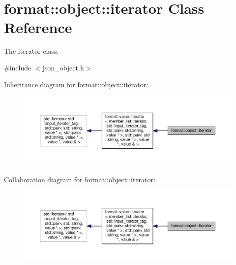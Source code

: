 \hypertarget{classformat_1_1object_1_1iterator}{}\section{format\+:\+:object\+:\+:iterator Class Reference}
\label{classformat_1_1object_1_1iterator}


The iterator class.  




{\ttfamily \#include $<$json\+\_\+object.\+h$>$}



Inheritance diagram for format\+:\+:object\+:\+:iterator\+:
\nopagebreak
\begin{figure}[H]
\begin{center}
\leavevmode
\includegraphics[width=350pt]{classformat_1_1object_1_1iterator__inherit__graph}
\end{center}
\end{figure}


Collaboration diagram for format\+:\+:object\+:\+:iterator\+:
\nopagebreak
\begin{figure}[H]
\begin{center}
\leavevmode
\includegraphics[width=350pt]{classformat_1_1object_1_1iterator__coll__graph}
\end{center}
\end{figure}
